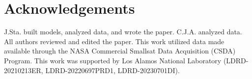 \documentclass{article}
\begin{document}


\section{Acknowledgements}

J.Sta. built models, analyzed data, and wrote the paper. C.J.A. analyzed data. All authors reviewed and edited the paper. This work utilized data made available through the NASA Commercial Smallsat Data Acquisition (CSDA) Program. This work was supported by Los Alamos National Laboratory (LDRD-20210213ER, LDRD-20220697PRD1, LDRD-20230701DI).



\end{document}
